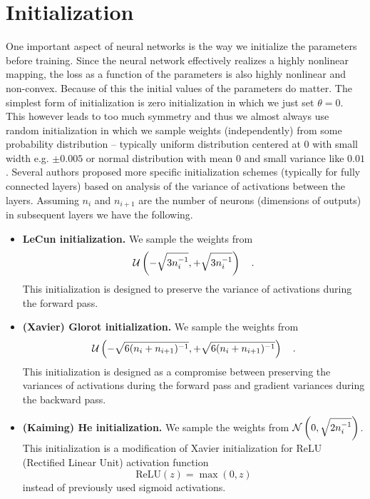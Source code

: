 \documentclass{myclass}
\begin{document}
\section{Initialization}

One important aspect of neural networks is the way we initialize the parameters before training.
Since the neural network effectively realizes a highly nonlinear mapping, the loss as a function of
the parameters is also highly nonlinear and non-convex. Because of this the initial values of the
parameters do matter. The simplest form of initialization is zero initialization in which we just
set \(\theta = 0\). This however leads to too much symmetry and thus we almost always use random
initialization in which we sample weights (independently) from some probability distribution --
typically uniform distribution centered at 0 with small width e.g. \(\pm0.005\) or normal
distribution with mean 0 and small variance like \(0.01\). Several authors proposed more specific
initialization schemes (typically for fully connected layers) based on analysis of the variance of
activations between the layers. Assuming \(n_i\) and \(n_{i+1}\) are the number of neurons
(dimensions of outputs) in subsequent layers we have the following.

\begin{itemize}
   \item \textbf{LeCun initialization.} We sample the weights from
   \[
      \mathcal{U}\left(-\sqrt{3n_{i}^{-1}}, +\sqrt{3n_{i}^{-1}}\right) \quad.
   \]
   This initialization is designed to preserve the variance of activations during the forward pass.
   
   \item \textbf{(Xavier) Glorot initialization.} We sample the weights from
   \[
      \mathcal{U}\left(-\sqrt{6(n_{i} + n_{i+1})^{-1}}, +\sqrt{6(n_{i} + n_{i+1})^{-1}}\right) \quad.
   \]
   This initialization is designed as a compromise between preserving the variances of activations
   during the forward pass and gradient variances during the backward pass.
   
   \item \textbf{(Kaiming) He initialization.} We sample the weights from \(\mathcal{N}\left(0, \sqrt{2
   n_{i}^{-1}}\right)\). This initialization is a modification of Xavier initialization for ReLU
   (Rectified Linear Unit) activation function
   \[\boxed{
      \text{ReLU}(z) = \max(0, z)
   }
   \]
   instead of previously used sigmoid activations.
\end{itemize}
\end{document}
